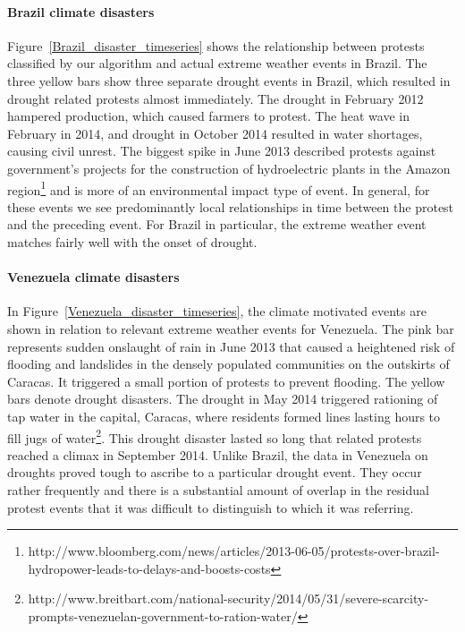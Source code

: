\documentclass[9pt,twocolumn,twoside]{pnas-new}
\begin{document}
\paragraph{Brazil climate disasters}
Figure~\ref{Brazil_disaster_timeseries} shows the relationship between protests classified by our algorithm and actual extreme weather events in Brazil.
The three yellow bars show three separate drought events in Brazil, which resulted in drought related protests almost immediately.
The drought in February 2012 hampered production, which caused farmers to protest.
The heat wave in February in 2014, and drought in October 2014 resulted in water shortages, causing civil unrest.
The biggest spike in June 2013 described protests against government's projects for the construction of hydroelectric plants in the Amazon region\footnote{http://www.bloomberg.com/news/articles/2013-06-05/protests-over-brazil-hydropower-leads-to-delays-and-boosts-costs} and is more of an environmental impact type of event.
In general, for these events we see predominantly local relationships in time between the protest and the preceding event.
For Brazil in particular, the extreme weather event matches fairly well with the onset of drought.


\paragraph{Venezuela climate disasters}
In Figure~\ref{Venezuela_disaster_timeseries}, the climate motivated events are shown in relation to relevant extreme weather events for Venezuela.
The pink bar represents sudden onslaught of rain in June 2013 that caused a heightened risk of flooding and landslides in the densely populated communities on the outskirts of Caracas.
It triggered a small portion of protests to prevent flooding.
The yellow bars denote drought disasters.
The drought in May 2014 triggered rationing of tap water in the capital, Caracas, where residents formed lines lasting hours to fill jugs of water\footnote{http://www.breitbart.com/national-security/2014/05/31/severe-scarcity-prompts-venezuelan-government-to-ration-water/}.
This drought disaster lasted so long that related protests reached a climax in September 2014.
Unlike Brazil, the data in Venezuela on droughts proved tough to ascribe to a particular drought event.
They occur rather frequently and there is a substantial amount of overlap in the residual protest events that it was difficult to distinguish to which it was referring.
\end{document}
